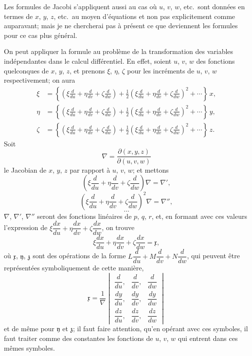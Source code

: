 \documentclass[11pt,a4paper]{book}
\theoremstyle{plain}
\begin{document}
Les formules de Jacobi s'appliquent aussi au cas o\`{u} $u$, $v$, $w$, etc.\ sont donn\'{e}es en termes de $x$, $y$, $z$, etc.\ au moyen d'\'{e}quations et non pas explicitement comme auparavant; mais je ne chercherai pas \`{a} pr\'{e}sent ce que deviennent les formules pour ce cas plus g\'{e}n\'{e}ral.

On peut appliquer la formule au probl\`{e}me de la transformation des variables ind\'{e}pendantes dans le calcul diff\'{e}rentiel. En effet, soient $u$, $v$, $w$ des fonctions quelconques de $x$, $y$, $z$, et prenons $\xi$, $\eta$, $\zeta$ pour les incr\'{e}ments de $u$, $v$, $w$ respectivement; on aura
\begin{align*}
\xi &= \left\{\left(\xi\frac{d}{du}+\eta\frac{d}{dv}+\zeta\frac{d}{dw}\right)+\tfrac{1}{2}\left(\xi\frac{d}{du}+\eta\frac{d}{dv}+\zeta\frac{d}{dw}\right)^2+\cdots\right\}\,x,\\
\eta &= \left\{\left(\xi\frac{d}{du}+\eta\frac{d}{dv}+\zeta\frac{d}{dw}\right)+\tfrac{1}{2}\left(\xi\frac{d}{du}+\eta\frac{d}{dv}+\zeta\frac{d}{dw}\right)^2+\cdots\right\}\,y,\\
\zeta &= \left\{\left(\xi\frac{d}{du}+\eta\frac{d}{dv}+\zeta\frac{d}{dw}\right)+\tfrac{1}{2}\left(\xi\frac{d}{du}+\eta\frac{d}{dv}+\zeta\frac{d}{dw}\right)^2+\cdots\right\}\,z.
\end{align*}
Soit
\[
\nabla=\frac{\partial(x,y,z)}{\partial(u,v,w)}
\]
le Jacobian de $x$, $y$, $z$ par rapport \`{a} $u$, $v$, $w$; et mettons
\[
\left(\xi\frac{d}{du}+\eta\frac{d}{dv}+\zeta\frac{d}{dw}\right)\nabla=\nabla',
\]
\[
\left(\xi\frac{d}{du}+\eta\frac{d}{dv}+\zeta\frac{d}{dw}\right)^2\nabla=\nabla'',
\]
\[
\ldots
\]
$\nabla$, $\nabla'$, $\nabla''$ seront des fonctions lin\'{e}aires de $p$, $q$, $r$, et, en formant avec ces valeurs l'expression de $\xi\dfrac{dx}{du}+\eta\dfrac{dx}{dv}+\zeta\dfrac{dx}{dw}$, on trouve
\[
\xi\frac{dx}{du}+\eta\frac{dx}{dv}+\zeta\frac{dx}{dw}=\mathfrak{x},
\]
o\`{u} $\mathfrak{x}$, $\mathfrak{y}$, $\mathfrak{z}$ sont des op\'{e}rations de la forme $L\dfrac{d}{du}+M\dfrac{d}{dv}+N\dfrac{d}{dw}$, qui peuvent \^{e}tre repr\'{e}sent\'{e}es symboliquement de cette mani\`{e}re,
\[
\mathfrak{x}=\frac{1}{\nabla}\begin{vmatrix}
\dfrac{d}{du}, & \dfrac{d}{dv}, & \dfrac{d}{dw}\\[4pt]
\dfrac{dy}{du}, & \dfrac{dy}{dv}, & \dfrac{dy}{dw}\\[4pt]
\dfrac{dz}{du}, & \dfrac{dz}{dv}, & \dfrac{dz}{dw}
\end{vmatrix}
\]
et de m\^{e}me pour $\mathfrak{y}$ et $\mathfrak{z}$; il faut faire attention, qu'en op\'{e}rant avec ces symboles, il faut traiter comme des constantes les fonctions de $u$, $v$, $w$ qui entrent dans ces m\^{e}mes symboles.
\end{document}
